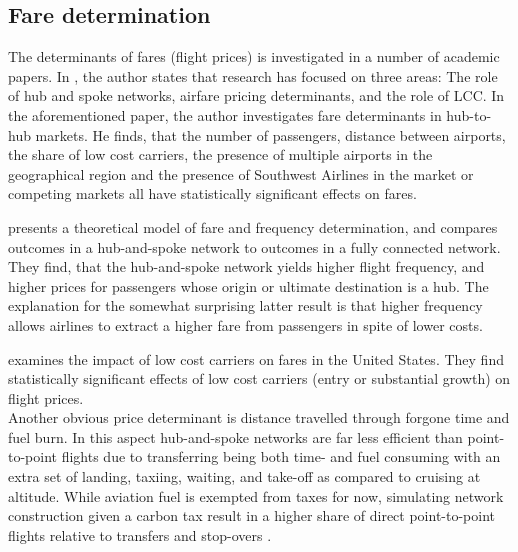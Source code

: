 \subsection{Fare determination}
\label{subsec:b_fare}
The determinants of fares (flight prices) is investigated in a number of academic papers. In \citet{vowles2006airfare}, the author states that research has focused on three areas: The role of hub and spoke networks, airfare pricing determinants, and the role of LCC. In the aforementioned paper, the author investigates fare determinants in hub-to-hub markets. He finds, that the number of passengers, distance between airports, the share of low cost carriers, the presence of multiple airports in the geographical region and the presence of Southwest Airlines in the market or competing markets all have statistically significant effects on fares.
\par
\citet{brueckner2001model} presents a theoretical model of fare and frequency determination, and compares outcomes in a hub-and-spoke network to outcomes in a fully connected network. They find, that the hub-and-spoke network yields higher flight frequency, and higher prices for passengers whose origin or ultimate destination is a hub. The explanation for the somewhat surprising latter result is that higher frequency allows airlines to extract a higher fare from passengers in spite of lower costs.
\par
\citet{abda2012impacts} examines the impact of low cost carriers on fares in the United States. They find statistically significant effects of low cost carriers (entry or substantial growth) on flight prices.  
\medskip\\
Another obvious price determinant is distance travelled through forgone time and fuel burn. In this aspect hub-and-spoke networks are far less efficient than point-to-point flights due to transferring being both time- and fuel consuming with an extra set of landing, taxiing, waiting, and take-off as compared to cruising at altitude. While aviation fuel is exempted from taxes for now, simulating network construction given a carbon tax result in a higher share of direct point-to-point flights relative to transfers and stop-overs \citep{o2012fuel}.

